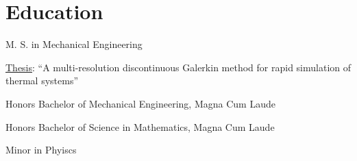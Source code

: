 \section{Education}
%
\begin{position}
  \begin{myitem}
  \item M. S. in Mechanical Engineering
  \item \href{https://smartech.gatech.edu/bitstream/handle/1853/42775/gempesaw_daniel_j_201112_mast.pdf?sequence=1p}{Thesis}: ``A multi-resolution discontinuous Galerkin method for rapid simulation of thermal systems''
  \end{myitem}
  \begin{myitem}
  \item Honors Bachelor of Mechanical Engineering, Magna Cum Laude
  \item Honors Bachelor of Science in Mathematics, Magna Cum Laude
  \item Minor in Phyiscs
  \end{myitem}
\end{position}

